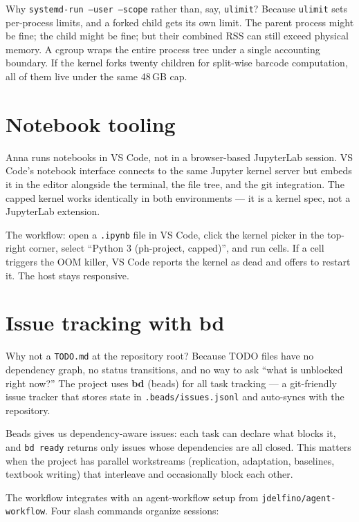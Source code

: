 Why \texttt{systemd-run --user --scope} rather than, say, \texttt{ulimit}? Because \texttt{ulimit} sets per-process limits, and a forked child gets its own limit. The parent process might be fine; the child might be fine; but their combined RSS can still exceed physical memory. A cgroup wraps the entire process tree under a single accounting boundary. If the kernel forks twenty children for split-wise barcode computation, all of them live under the same 48\,GB cap.

\section{Notebook tooling}

Anna runs notebooks in VS Code, not in a browser-based JupyterLab session. VS Code's notebook interface connects to the same Jupyter kernel server but embeds it in the editor alongside the terminal, the file tree, and the git integration. The capped kernel works identically in both environments --- it is a kernel spec, not a JupyterLab extension.

The workflow: open a \texttt{.ipynb} file in VS Code, click the kernel picker in the top-right corner, select ``Python 3 (ph-project, capped)'', and run cells. If a cell triggers the OOM killer, VS Code reports the kernel as dead and offers to restart it. The host stays responsive.

\section{Issue tracking with bd}

Why not a \texttt{TODO.md} at the repository root? Because TODO files have no dependency graph, no status transitions, and no way to ask ``what is unblocked right now?'' The project uses \textbf{bd} (beads) for all task tracking --- a git-friendly issue tracker that stores state in \texttt{.beads/issues.jsonl} and auto-syncs with the repository.

Beads gives us dependency-aware issues: each task can declare what blocks it, and \texttt{bd ready} returns only issues whose dependencies are all closed. This matters when the project has parallel workstreams (replication, adaptation, baselines, textbook writing) that interleave and occasionally block each other.

The workflow integrates with an agent-workflow setup from \texttt{jdelfino/agent-workflow}. Four slash commands organize sessions:


